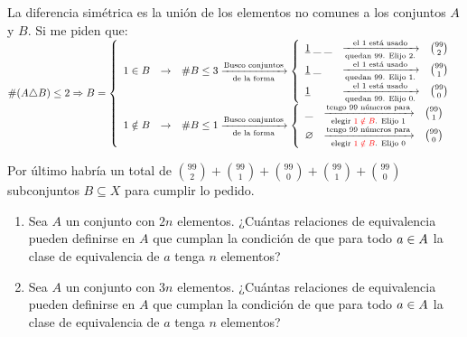 La diferencia simétrica es la unión de los elementos no comunes a los conjuntos $A$ y $B$. Si me piden que:\\
$\#( A \triangle B) \leq 2 \entonces B =
	\llave{ccl}{
		1 \en B & \to & \#B \leq 3
		\flecha{Busco conjuntos}[de la forma]
		\llave{lll}{
			\underline{1}\; \_ \;\_ &\flecha{el 1 está usado}[quedan  99. Elijo 2.] &   \binom{99}{2}\\
			\underline{1} \;\_      &\flecha{el 1 está usado}[quedan  99. Elijo 1.] &   \binom{99}{1}\\
			\underline{1}           &\flecha{el 1 está usado}[quedan  99. Elijo 0.] &  \binom{99}{0}
		}\\
		1 \notin B & \to & \#B \leq 1
		\flecha{Busco conjuntos}[de la forma]
		\llave{lll}{
			\_ & \flecha{tengo 99 números para}[elegir \red{$1 \notin B$}. Elijo 1]     & \binom{99}{1}\\
			\vacio & \flecha{tengo 99 números para}[elegir \red{$1 \notin B$}. Elijo 0] & \binom{99}{0}
		}\\
	}$

Por último habría un total de $ \binom{99}{2} + \binom{99}{1} + \binom{99}{0} +\binom{99}{1} + \binom{99}{0}$ subconjuntos $B \subseteq X$
para cumplir lo pedido.


\ejercicio

\begin{enumerate}[label=\roman*)]
	\item Sea $A$ un conjunto con $2n$ elementos. ¿Cuántas relaciones de equivalencia pueden definirse en $A$ que cumplan la condición
	      de que para todo $a \in A$ la clase de equivalencia de $a$ tenga $n$ elementos?

	\item Sea $A$ un conjunto con $3n$ elementos. ¿Cuántas relaciones de equivalencia pueden definirse en $A$ que cumplan la condición
	      de que para todo $a \in A$ la clase de equivalencia de $a$ tenga $n$ elementos?

\end{enumerate}


